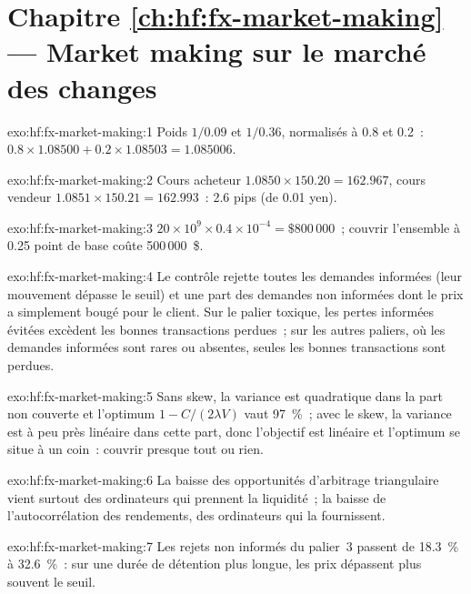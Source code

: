 \section*{Chapitre \ref{ch:hf:fx-market-making} --- Market making sur le marché des changes}

\begin{solution}{exo:hf:fx-market-making:1}
Poids $1/0.09$ et $1/0.36$, normalisés à 0.8 et 0.2~: $0.8\times1.08500+0.2\times1.08503=1.085006$.
\end{solution}

\begin{solution}{exo:hf:fx-market-making:2}
Cours acheteur $1.0850\times150.20=162.967$, cours vendeur $1.0851\times150.21=162.993$~: 2.6 pips (de 0.01 yen).
\end{solution}

\begin{solution}{exo:hf:fx-market-making:3}
$20\times10^9\times0.4\times10^{-4}=\$800\,000$~; couvrir l'ensemble à 0.25 point de base coûte 500\,000~\$.
\end{solution}

\begin{solution}{exo:hf:fx-market-making:4}
Le contrôle rejette toutes les demandes informées (leur mouvement dépasse le seuil) et une part des demandes non informées dont le prix a
simplement bougé pour le client. Sur le palier toxique, les pertes informées évitées excèdent les bonnes transactions perdues~; sur les autres
paliers, où les demandes informées sont rares ou absentes, seules les bonnes transactions sont perdues.
\end{solution}

\begin{solution}{exo:hf:fx-market-making:5}
Sans skew, la variance est quadratique dans la part non couverte et l'optimum $1-C/(2\lambda V)$ vaut 97~\%~; avec le skew, la variance est à peu
près linéaire dans cette part, donc l'objectif est linéaire et l'optimum se situe à un coin~: couvrir presque tout ou rien.
\end{solution}

\begin{solution}{exo:hf:fx-market-making:6}
La baisse des opportunités d'arbitrage triangulaire vient surtout des ordinateurs qui prennent la liquidité~; la baisse de l'autocorrélation
des rendements, des ordinateurs qui la fournissent.
\end{solution}

\begin{solution}{exo:hf:fx-market-making:7}
Les rejets non informés du palier~3 passent de 18.3~\% à 32.6~\%~: sur une durée de détention plus longue, les prix dépassent plus souvent le seuil.
\end{solution}

